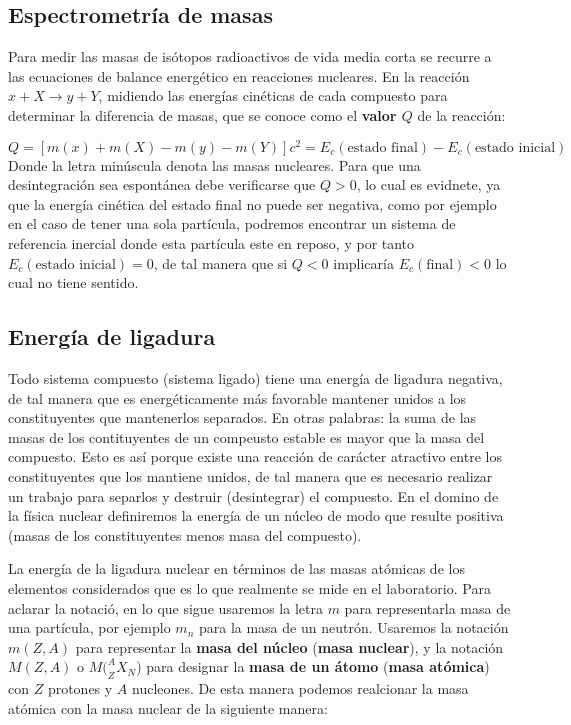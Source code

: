 \subsection{Espectrometría de masas}

Para medir las masas de isótopos radioactivos de vida media corta se recurre a las ecuaciones de balance energético en reacciones nucleares. En la reacción $x+X\rightarrow y+Y$, midiendo las energías cinéticas de cada compuesto para determinar la diferencia de masas, que se conoce como el \textbf{valor $Q$} de la reacción:

\begin{equation}
	Q=[m(x)+m(X)-m(y)-m(Y)]c^2 = E_c (\text{estado final}) -  E_c (\text{estado inicial})
\end{equation}
Donde la letra minúscula denota las masas nucleares. Para que una desintegración sea espontánea debe verificarse que $Q>0$, lo cual es evidnete, ya que la energía cinética del estado final no puede ser negativa, como por ejemplo en el caso de tener una sola partícula, podremos encontrar un sistema de referencia inercial donde esta partícula este en reposo, y por tanto $E_c (\text{estado inicial})=0$, de tal manera que si $Q<0$ implicaría $E_c (\text{final})<0$ lo cual no tiene sentido.

\subsection{Energía de ligadura}

Todo sistema compuesto (sistema ligado) tiene una energía de ligadura negativa, de tal manera que es energéticamente más favorable mantener unidos a los constituyentes que mantenerlos separados. En otras palabras: la suma de las masas de los contituyentes de un compeusto estable es mayor que la masa del compuesto. Esto es así porque existe una reacción de carácter atractivo entre los constituyentes que los mantiene unidos, de tal manera que es necesario realizar un trabajo para separlos y destruir (desintegrar) el compuesto. En el domino de la física nuclear definiremos la energía de un núcleo de modo que resulte positiva (masas de los constituyentes menos masa del compuesto).

La energía de la ligadura nuclear en términos de las masas atómicas de los elementos considerados que es lo que realmente se mide en el laboratorio. Para aclarar la notació, en lo que sigue usaremos la letra $m$ para representarla masa de una partícula, por ejemplo $m_n$ para la masa de un neutrón. Usaremos la notación $m(Z,A)$ para representar la \textbf{masa del núcleo} (\textbf{masa nuclear}), y la notación $M(Z,A)$ o $M(_Z^A X_N$) para designar la \textbf{masa de un átomo} (\textbf{masa atómica}) con $Z$ protones y $A$ nucleones. De esta manera podemos realcionar la masa atómica con la masa nuclear de la siguiente manera:

